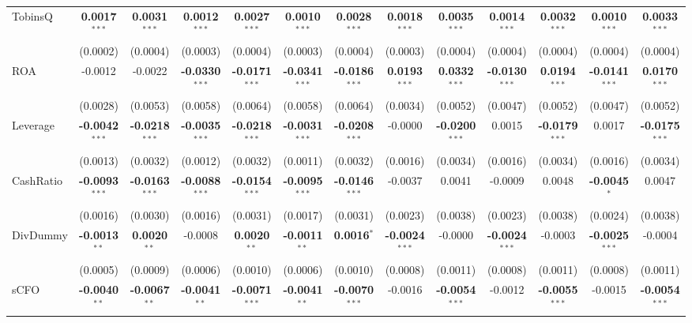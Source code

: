 \documentclass[11pt,a4paper]{article}
\begin{document}
\begin{table}[htbp]
\begin{tabular}{lcccccccccccc}
TobinsQ & \textbf{0.0017}$^{***}$ & \textbf{0.0031}$^{***}$ & \textbf{0.0012}$^{***}$ & \textbf{0.0027}$^{***}$ & \textbf{0.0010}$^{***}$ & \textbf{0.0028}$^{***}$ & \textbf{0.0018}$^{***}$ & \textbf{0.0035}$^{***}$ & \textbf{0.0014}$^{***}$ & \textbf{0.0032}$^{***}$ & \textbf{0.0010}$^{***}$ & \textbf{0.0033}$^{***}$ \\
 & (0.0002) & (0.0004) & (0.0003) & (0.0004) & (0.0003) & (0.0004) & (0.0003) & (0.0004) & (0.0004) & (0.0004) & (0.0004) & (0.0004) \\
ROA & -0.0012 & -0.0022 & \textbf{-0.0330}$^{***}$ & \textbf{-0.0171}$^{***}$ & \textbf{-0.0341}$^{***}$ & \textbf{-0.0186}$^{***}$ & \textbf{0.0193}$^{***}$ & \textbf{0.0332}$^{***}$ & \textbf{-0.0130}$^{***}$ & \textbf{0.0194}$^{***}$ & \textbf{-0.0141}$^{***}$ & \textbf{0.0170}$^{***}$ \\
 & (0.0028) & (0.0053) & (0.0058) & (0.0064) & (0.0058) & (0.0064) & (0.0034) & (0.0052) & (0.0047) & (0.0052) & (0.0047) & (0.0052) \\
Leverage & \textbf{-0.0042}$^{***}$ & \textbf{-0.0218}$^{***}$ & \textbf{-0.0035}$^{***}$ & \textbf{-0.0218}$^{***}$ & \textbf{-0.0031}$^{***}$ & \textbf{-0.0208}$^{***}$ & -0.0000 & \textbf{-0.0200}$^{***}$ & 0.0015 & \textbf{-0.0179}$^{***}$ & 0.0017 & \textbf{-0.0175}$^{***}$ \\
 & (0.0013) & (0.0032) & (0.0012) & (0.0032) & (0.0011) & (0.0032) & (0.0016) & (0.0034) & (0.0016) & (0.0034) & (0.0016) & (0.0034) \\
CashRatio & \textbf{-0.0093}$^{***}$ & \textbf{-0.0163}$^{***}$ & \textbf{-0.0088}$^{***}$ & \textbf{-0.0154}$^{***}$ & \textbf{-0.0095}$^{***}$ & \textbf{-0.0146}$^{***}$ & -0.0037 & 0.0041 & -0.0009 & 0.0048 & \textbf{-0.0045}$^{*}$ & 0.0047 \\
 & (0.0016) & (0.0030) & (0.0016) & (0.0031) & (0.0017) & (0.0031) & (0.0023) & (0.0038) & (0.0023) & (0.0038) & (0.0024) & (0.0038) \\
DivDummy & \textbf{-0.0013}$^{**}$ & \textbf{0.0020}$^{**}$ & -0.0008 & \textbf{0.0020}$^{**}$ & \textbf{-0.0011}$^{**}$ & \textbf{0.0016}$^{*}$ & \textbf{-0.0024}$^{***}$ & -0.0000 & \textbf{-0.0024}$^{***}$ & -0.0003 & \textbf{-0.0025}$^{***}$ & -0.0004 \\
 & (0.0005) & (0.0009) & (0.0006) & (0.0010) & (0.0006) & (0.0010) & (0.0008) & (0.0011) & (0.0008) & (0.0011) & (0.0008) & (0.0011) \\
sCFO & \textbf{-0.0040}$^{**}$ & \textbf{-0.0067}$^{**}$ & \textbf{-0.0041}$^{**}$ & \textbf{-0.0071}$^{***}$ & \textbf{-0.0041}$^{**}$ & \textbf{-0.0070}$^{***}$ & -0.0016 & \textbf{-0.0054}$^{***}$ & -0.0012 & \textbf{-0.0055}$^{***}$ & -0.0015 & \textbf{-0.0054}$^{***}$ \\

\end{tabular}
\end{table}
\end{document}
